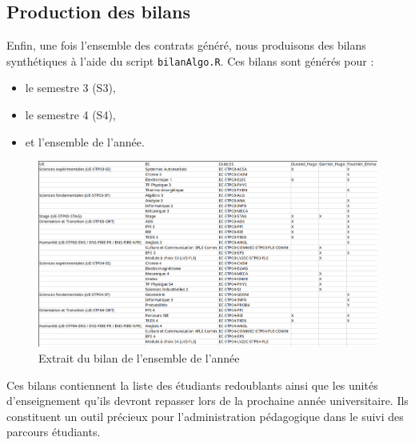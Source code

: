 \subsection{Production des bilans}

Enfin, une fois l’ensemble des contrats généré, nous produisons des bilans synthétiques à l’aide du script \texttt{bilanAlgo.R}. Ces bilans sont générés pour :
\begin{itemize}
    \item le semestre 3 (S3),
    \item le semestre 4 (S4),
    \item et l’ensemble de l’année.
\end{itemize}

\begin{figure}[H]
  \centering
  \includegraphics[width=\linewidth]{images/bilan.png}
  \caption{Extrait du bilan de l'ensemble de l'année}
  \label{generation_bilan}
\end{figure}

Ces bilans contiennent la liste des étudiants redoublants ainsi que les unités d’enseignement qu’ils devront repasser lors de la prochaine année universitaire. Ils constituent un outil précieux pour l’administration pédagogique dans le suivi des parcours étudiants.
